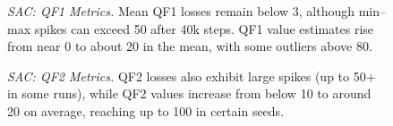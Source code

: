 \begin{figure}
	\centering
	\caption{\emph{SAC: QF1 Metrics.} Mean QF1 losses remain below 3, although min–max spikes can exceed 50 after 40k steps. QF1 value estimates rise from near 0 to about 20 in the mean, with some outliers above 80.}
	\label{fig:sac_q_metrics_1}
\end{figure}

\begin{figure}
	\centering
	\quad
	\caption{\emph{SAC: QF2 Metrics.} QF2 losses also exhibit large spikes (up to 50+ in some runs), while QF2 values increase from below 10 to around 20 on average, reaching up to 100 in certain seeds.}
	\label{fig:sac_q_metrics_2}
\end{figure}

